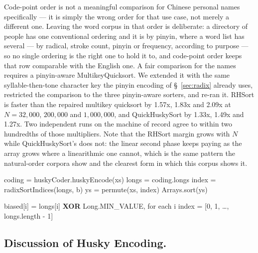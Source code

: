 \documentclass[twoside,leqno,twocolumn]{article}
\begin{document}
Code-point order is not a meaningful comparison for Chinese personal names specifically —
it is simply the wrong order for that use case, not merely a different one.
Leaving the word corpus in that order is deliberate: a directory of people has one conventional
ordering and it is by pinyin, where a word list has several --- by radical, stroke count, pinyin or
frequency, according to purpose --- so no single ordering is the right one to hold it to,
and code-point order keeps that row comparable with the English one.
A fair comparison for the names requires a pinyin-aware MultikeyQuicksort.
We extended it with the same syllable-then-tone character key the pinyin encoding of \S~\ref{sec:radix} already uses,
restricted the comparison to the three pinyin-aware sorters, and re-ran it.
RHSort is faster than the repaired multikey quicksort by 1.57x, 1.83x and 2.09x at $N = 32{,}000$,
$200{,}000$ and $1{,}000{,}000$, and QuickHuskySort by 1.33x, 1.49x and 1.27x.
Two independent runs on the machine of record agree to within two hundredths of those multipliers.
Note that the RHSort margin grows with $N$ while QuickHuskySort's does not:
the linear second phase keeps paying as the array grows where a linearithmic one cannot,
which is the same pattern the natural-order corpora show and the clearest form in which this corpus
shows it.

\begin{algorithm2e}
 coding = huskyCoder.huskyEncode(xs)\;
 longs = coding.longs\;
 index = radixSortIndices(longs, b)\;
 ys = permute(xs, index)\;
 Arrays.sort(ys)\;
 \caption{RadixHuskySort.sort}
 \label{alg:the_alg5}
\end{algorithm2e}

\begin{algorithm2e}
 biased[i] = longs[i] {\bf XOR} Long.MIN\_VALUE, for each i\;
 index = [0, 1, \ldots, longs.length - 1]\;
 \caption{radixSortIndices (LSD, deferred permutation)}
 \label{alg:the_alg6}
\end{algorithm2e}

\subsection{Discussion of Husky Encoding.}
\end{document}
